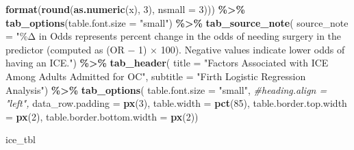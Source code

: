 \documentclass[
]{article}
\newenvironment{Shaded}{\begin{snugshade}}{\end{snugshade}}
\newcommand{\AttributeTok}[1]{\textcolor[rgb]{0.13,0.29,0.53}{#1}}
\newcommand{\CommentTok}[1]{\textcolor[rgb]{0.56,0.35,0.01}{\textit{#1}}}
\newcommand{\DecValTok}[1]{\textcolor[rgb]{0.00,0.00,0.81}{#1}}
\newcommand{\FunctionTok}[1]{\textcolor[rgb]{0.13,0.29,0.53}{\textbf{#1}}}
\newcommand{\NormalTok}[1]{#1}
\newcommand{\SpecialCharTok}[1]{\textcolor[rgb]{0.81,0.36,0.00}{\textbf{#1}}}
\newcommand{\StringTok}[1]{\textcolor[rgb]{0.31,0.60,0.02}{#1}}
\begin{document}
\begin{Shaded}
\begin{Highlighting}[]
                            \FunctionTok{format}\NormalTok{(}\FunctionTok{round}\NormalTok{(}\FunctionTok{as.numeric}\NormalTok{(x), }\DecValTok{3}\NormalTok{), }\AttributeTok{nsmall =} \DecValTok{3}\NormalTok{))) }\SpecialCharTok{\%\textgreater{}\%}
  \FunctionTok{tab\_options}\NormalTok{(}\AttributeTok{table.font.size =} \StringTok{"small"}\NormalTok{) }\SpecialCharTok{\%\textgreater{}\%}
  \FunctionTok{tab\_source\_note}\NormalTok{(}
    \AttributeTok{source\_note =} \StringTok{"\%Δ in Odds represents percent change in the odds of needing surgery}
\StringTok{    in the predictor (computed as (OR − 1) × 100). Negative values indicate lower}
\StringTok{    odds of having an ICE."}\NormalTok{) }\SpecialCharTok{\%\textgreater{}\%} 
  \FunctionTok{tab\_header}\NormalTok{(}
    \AttributeTok{title =} \StringTok{"Factors Associated with ICE Among Adults Admitted for OC"}\NormalTok{,}
    \AttributeTok{subtitle =} \StringTok{"Firth Logistic Regression Analysis"}\NormalTok{) }\SpecialCharTok{\%\textgreater{}\%} 
  \FunctionTok{tab\_options}\NormalTok{(}
    \AttributeTok{table.font.size =} \StringTok{"small"}\NormalTok{,}
    \CommentTok{\#heading.align = "left",}
    \AttributeTok{data\_row.padding =} \FunctionTok{px}\NormalTok{(}\DecValTok{3}\NormalTok{),}
    \AttributeTok{table.width =} \FunctionTok{pct}\NormalTok{(}\DecValTok{85}\NormalTok{),}
    \AttributeTok{table.border.top.width =} \FunctionTok{px}\NormalTok{(}\DecValTok{2}\NormalTok{),}
    \AttributeTok{table.border.bottom.width =} \FunctionTok{px}\NormalTok{(}\DecValTok{2}\NormalTok{))}

\NormalTok{ice\_tbl}
\end{Highlighting}
\end{Shaded}
\end{document}
